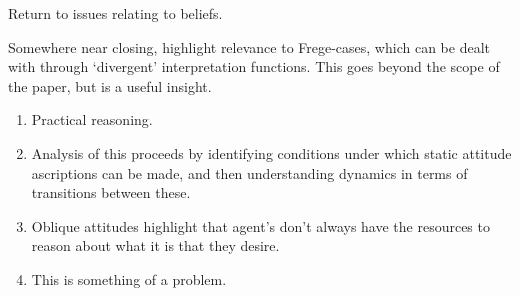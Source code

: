 \documentclass[10pt]{article}
\begin{document}
Return to issues relating to beliefs.








Somewhere near closing, highlight relevance to Frege-cases, which can be dealt with through `divergent' interpretation functions.
This goes beyond the scope of the paper, but is a useful insight.





\newpage

\begin{enumerate}
\item Practical reasoning.
\item Analysis of this proceeds by identifying conditions under which static attitude ascriptions can be made, and then understanding dynamics in terms of transitions between these.
\item Oblique attitudes highlight that agent's don't always have the resources to reason about what it is that they desire.
\item This is something of a problem.
\end{enumerate}
\end{document}
